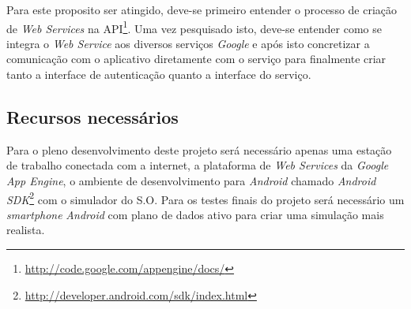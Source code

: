 Para este proposito ser atingido, deve-se primeiro entender o processo de criação de \emph{Web
Services} na API\footnote{\url{http://code.google.com/appengine/docs/}}. Uma vez pesquisado isto,
deve-se entender como se integra o \emph{Web Service} aos diversos serviços \emph{Google} e após
isto concretizar a comunicação com o aplicativo diretamente com o serviço para finalmente criar
tanto a interface de autenticação quanto a interface do serviço.

\subsection{Recursos necessários}
Para o pleno desenvolvimento deste projeto será necessário apenas uma estação de trabalho conectada
com a internet, a plataforma de \emph{Web Services} da \emph{Google App Engine}, o ambiente de
desenvolvimento para \emph{Android}  chamado \emph{Android
SDK}\footnote{\url{http://developer.android.com/sdk/index.html}} com o simulador do S.O. Para os
testes finais do projeto será necessário um \emph{smartphone} \emph{Android} com plano de dados ativo para criar
uma simulação mais realista.
